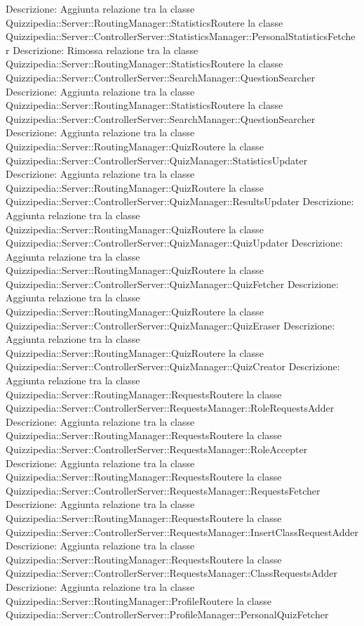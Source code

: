 Descrizione: Aggiunta relazione tra la classe Quizzipedia::Server::RoutingManager::StatisticsRoutere la classe Quizzipedia::Server::ControllerServer::StatisticsManager::PersonalStatisticsFetcher 
Descrizione: Rimossa relazione tra la classe Quizzipedia::Server::RoutingManager::StatisticsRoutere la classe Quizzipedia::Server::ControllerServer::SearchManager::QuestionSearcher 
Descrizione: Aggiunta relazione tra la classe Quizzipedia::Server::RoutingManager::StatisticsRoutere la classe Quizzipedia::Server::ControllerServer::SearchManager::QuestionSearcher 
Descrizione: Aggiunta relazione tra la classe Quizzipedia::Server::RoutingManager::QuizRoutere la classe Quizzipedia::Server::ControllerServer::QuizManager::StatisticsUpdater 
Descrizione: Aggiunta relazione tra la classe Quizzipedia::Server::RoutingManager::QuizRoutere la classe Quizzipedia::Server::ControllerServer::QuizManager::ResultsUpdater 
Descrizione: Aggiunta relazione tra la classe Quizzipedia::Server::RoutingManager::QuizRoutere la classe Quizzipedia::Server::ControllerServer::QuizManager::QuizUpdater 
Descrizione: Aggiunta relazione tra la classe Quizzipedia::Server::RoutingManager::QuizRoutere la classe Quizzipedia::Server::ControllerServer::QuizManager::QuizFetcher 
Descrizione: Aggiunta relazione tra la classe Quizzipedia::Server::RoutingManager::QuizRoutere la classe Quizzipedia::Server::ControllerServer::QuizManager::QuizEraser 
Descrizione: Aggiunta relazione tra la classe Quizzipedia::Server::RoutingManager::QuizRoutere la classe Quizzipedia::Server::ControllerServer::QuizManager::QuizCreator 
Descrizione: Aggiunta relazione tra la classe Quizzipedia::Server::RoutingManager::RequestsRoutere la classe Quizzipedia::Server::ControllerServer::RequestsManager::RoleRequestsAdder 
Descrizione: Aggiunta relazione tra la classe Quizzipedia::Server::RoutingManager::RequestsRoutere la classe Quizzipedia::Server::ControllerServer::RequestsManager::RoleAccepter 
Descrizione: Aggiunta relazione tra la classe Quizzipedia::Server::RoutingManager::RequestsRoutere la classe Quizzipedia::Server::ControllerServer::RequestsManager::RequestsFetcher 
Descrizione: Aggiunta relazione tra la classe Quizzipedia::Server::RoutingManager::RequestsRoutere la classe Quizzipedia::Server::ControllerServer::RequestsManager::InsertClassRequestAdder 
Descrizione: Aggiunta relazione tra la classe Quizzipedia::Server::RoutingManager::RequestsRoutere la classe Quizzipedia::Server::ControllerServer::RequestsManager::ClassRequestsAdder 
Descrizione: Aggiunta relazione tra la classe Quizzipedia::Server::RoutingManager::ProfileRoutere la classe Quizzipedia::Server::ControllerServer::ProfileManager::PersonalQuizFetcher 
